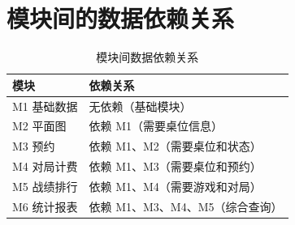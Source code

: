 \section{模块间的数据依赖关系}

\begin{table}[H]
  \centering
  \caption{模块间数据依赖关系}
  \label{tab:module_deps}
  \begin{tabularx}{\textwidth}{|l|X|}
    \hline
    \textbf{模块} & \textbf{依赖关系} \\
    \hline
    M1 基础数据 & 无依赖（基础模块） \\
    \hline
    M2 平面图 & 依赖 M1（需要桌位信息） \\
    \hline
    M3 预约 & 依赖 M1、M2（需要桌位和状态） \\
    \hline
    M4 对局计费 & 依赖 M1、M3（需要桌位和预约） \\
    \hline
    M5 战绩排行 & 依赖 M1、M4（需要游戏和对局） \\
    \hline
    M6 统计报表 & 依赖 M1、M3、M4、M5（综合查询） \\
    \hline
  \end{tabularx}
\end{table}
